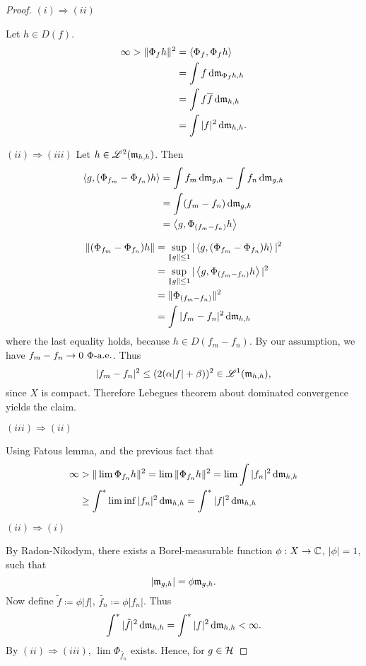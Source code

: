 \begin{proof}
 $(i) \Rightarrow (ii)$
 
 Let $h \in D(f)$.
 \begin{align*}
   \infty > \|\Phi_f h\| ^2 &= \left\langle  \Phi_f , \Phi_f h \right\rangle \\
   &= \int f \operatorname{d}\! \mathfrak{m}_{\Phi_f h, h} \\
   &= \int f \overline{f} \operatorname{d}\! \mathfrak{m}_{h,h} \\
   &= \int | f | ^2 \operatorname{d}\! \mathfrak{m}_{h,h}.
 \end{align*}

 
  $(ii) \Rightarrow (iii)$
  Let $h \in \mathscr{L}^2(\mathfrak{m}_{h,h})$. Then 
  \begin{align*}
    \left\langle g, (\Phi_{f_m} - \Phi_{f_n})h \right\rangle &= \int f_m \operatorname{d}\! \mathfrak{m}_{g,h} - \int f_n \operatorname{d}\! \mathfrak{m}_{g,h} \\
    &= \int (f_m - f_n) \operatorname{d}\! \mathfrak{m}_{g,h} \\
    &= \left\langle g, \Phi_{(f_m - f_n)} h  \right\rangle
  \end{align*}
  
  \begin{align*}
    \|(\Phi_{f_m} - \Phi_{f_n}) h \| &=   \sup_{\|g\| \leq 1} 
    |\left\langle g, (\Phi_{f_m} - \Phi_{f_n})h \right\rangle|^2 \\
    &= \sup_{\|g\| \leq 1} |\left\langle g, \Phi_{(f_m - f_n)}h \right\rangle| ^2 \\
    &= \| \Phi_{(f_m - f_n)} \| ^2\\
    &= \int |f_m - f_n|^2 \operatorname{d}\! \mathfrak{m}_{h,h}
  \end{align*}
where the last equality holds, because $h \in D(f_m - f_n)$. By our assumption, we have $f_m -f_n \to 0 ~\Phi\text{-a.e.}$. Thus
\[
| f_m - f_n |^2 \leq (2(\alpha |f| + \beta))^2 \in \mathscr{L}^1(\mathfrak{m}_{h,h}),
\]
since $X$ is compact. Therefore Lebegues theorem about dominated convergence yields the claim.

$(iii) \Rightarrow (ii)$

Using Fatous lemma, and the previous fact that 
\begin{align*}
  \infty & > \| \lim \Phi_{f_n} h \| ^2 = \lim \| \Phi_{f_n} h \| ^2 =
  \lim \int | f_n | ^2 \operatorname{d}\! \mathfrak{m}_{h,h} \\
  & \geq \int ^{*} \liminf |f_n | ^2 \operatorname{d}\! \mathfrak{m}_{h,h} = \int ^{*} |f|^2 \operatorname{d}\! \mathfrak{m}_{h,h}
\end{align*}

$(ii) \Rightarrow (i)$

 By Radon-Nikodym, there exists a Borel-measurable function 
 $\phi : X \to \mathbb{C}$, $|\phi| = 1$, such that 
 \[
 | \mathfrak{m}_{g,h} | = \phi \mathfrak{m}_{g,h}.
 \]
 Now define $\tilde{f} \coloneqq \phi |f|$, $\tilde{f_n} \coloneqq
 \phi |f_n|$. Thus 
 \[
 \int ^{*} |\tilde{f} |^2 \operatorname{d}\! \mathfrak{m}_{h,h} = \int ^{*} |f|^2 \operatorname{d}\! \mathfrak{m}_{h,h} < \infty.
 \]
 By $(ii) \Rightarrow (iii)$, $\lim \Phi_{\tilde{f_n}}$ exists. Hence, for $g \in \mathcal{H}$
 

\end{proof}
